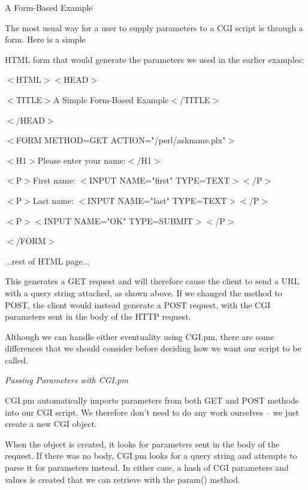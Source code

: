 \documentclass[a4paper,11pt]{book}
\begin{document}
\noindent A Form-Based Example

\noindent 

\noindent The most usual way for a user to supply parameters to a CGI script is through a form. Here is a simple

\noindent HTML form that would generate the parameters we used in the earlier examples:

\noindent 

\noindent 

\noindent $<$HTML$>$$<$HEAD$>$

\noindent $<$TITLE$>$A Simple Form-Based Example$<$/TITLE$>$

\noindent $<$/HEAD$>$

\noindent $<$FORM METHOD=GET ACTION="/perl/askname.plx"$>$

\noindent $<$H1$>$Please enter your name:$<$/H1$>$

\noindent $<$P$>$First name: $<$INPUT NAME="first" TYPE=TEXT$>$$<$/P$>$

\noindent $<$P$>$Last name: $<$INPUT NAME="last" TYPE=TEXT$>$$<$/P$>$

\noindent $<$P$>$$<$INPUT NAME="OK" TYPE=SUBMIT$>$$<$/P$>$

\noindent $<$/FORM$>$

\noindent ...rest of HTML page...

\noindent 

\noindent This generates a GET request and will therefore cause the client to send a URL with a query string attached, as shown above. If we changed the method to POST, the client would instead generate a POST request, with the CGI parameters sent in the body of the HTTP request.

\noindent 

\noindent Although we can handle either eventuality using CGI.pm, there are some differences that we should consider before deciding how we want our script to be called.

\noindent 

\noindent \textit{Passing Parameters with CGI.pm}

\noindent CGI.pm automatically imports parameters from both GET and POST methods into our CGI script. We therefore don't need to do any work ourselves -- we just create a new CGI object.

\noindent 

\noindent When the object is created, it looks for parameters sent in the body of the request. If there was no body, CGI.pm looks for a query string and attempts to parse it for parameters instead. In either case, a hash of CGI parameters and values is created that we can retrieve with the param() method.
\end{document}
